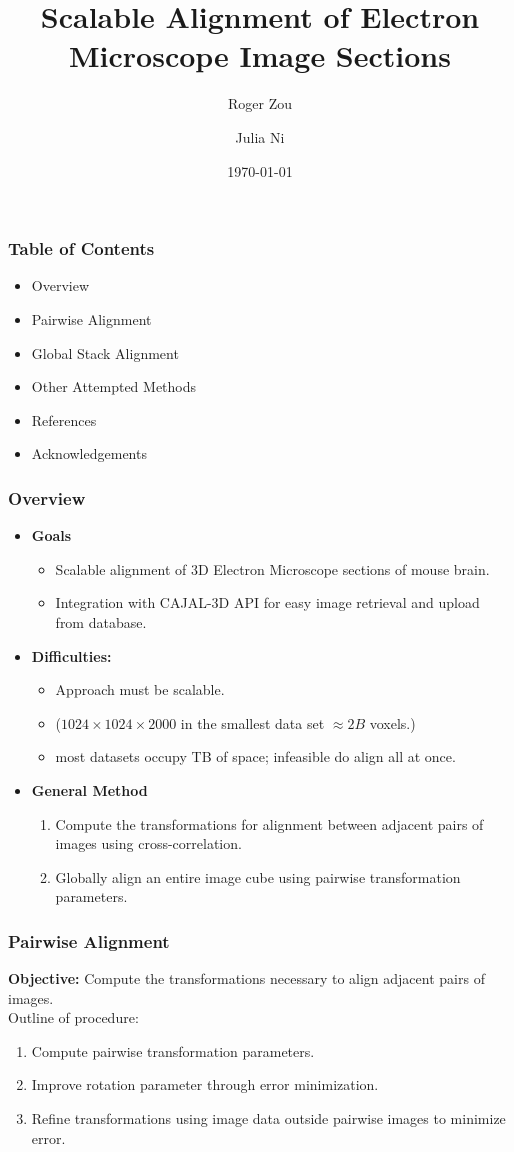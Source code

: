 \documentclass{beamer}
\begin{document}
\title[Scalable EM Alignment]
{Scalable Alignment of Electron Microscope Image Sections}
\author[Zou, Ni] {Roger Zou \and Julia Ni}
\date{\today}

\frame{\titlepage}

\begin{frame}
\frametitle{Table of Contents}
\begin{itemize}
\item Overview
\item Pairwise Alignment
\item Global Stack Alignment
\item Other Attempted Methods
\item References
\item Acknowledgements 
\end{itemize}
\end{frame}

\begin{frame}
\frametitle{Overview}
\begin{itemize}
\item \textbf{Goals}
\begin{itemize}
\item Scalable alignment of 3D Electron Microscope sections of mouse brain.
\item Integration with CAJAL-3D API for easy image retrieval and upload from database.
\end{itemize}
\item \textbf{Difficulties:} 
\begin{itemize}
\item Approach must be scalable.
\item ($1024 \times 1024 \times 2000$ in the smallest data set $\approx 2B$ voxels.)
\item most datasets occupy TB of space; infeasible do align all at once.
\end{itemize}
\item \textbf{General Method}
\begin{enumerate}
\item Compute the transformations for alignment between adjacent pairs of images using cross-correlation.
\item Globally align an entire image cube using pairwise transformation parameters.
\end{enumerate}
\end{itemize}
\end{frame}

\begin{frame}
\frametitle{Pairwise Alignment}
\textbf{Objective:} Compute the transformations necessary to align adjacent pairs of images. \\
Outline of procedure:
\begin{enumerate}
\item Compute pairwise transformation parameters.
\item Improve rotation parameter through error minimization.
\item Refine transformations using image data outside pairwise images to minimize error.
\end{enumerate}
\end{frame}
\end{document}
